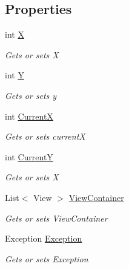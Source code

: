 \subsection*{Properties}
\begin{DoxyCompactItemize}
\item 
int \mbox{\hyperlink{class_gtd_app_1_1_console_core_1_1_views_1_1_helpers_1_1_exception_helper_a9ad22bde1729cc8f0d92143ac2edaaef}{X}}
\begin{DoxyCompactList}\small\item\em Gets or sets X \end{DoxyCompactList}\item 
int \mbox{\hyperlink{class_gtd_app_1_1_console_core_1_1_views_1_1_helpers_1_1_exception_helper_af1f8d53f25515915f741e4c3e8a1ad2d}{Y}}
\begin{DoxyCompactList}\small\item\em Gets or sets y \end{DoxyCompactList}\item 
int \mbox{\hyperlink{class_gtd_app_1_1_console_core_1_1_views_1_1_helpers_1_1_exception_helper_a8ff9d4e536056a83973e592e07465ddc}{CurrentX}}
\begin{DoxyCompactList}\small\item\em Gets or sets currentX \end{DoxyCompactList}\item 
int \mbox{\hyperlink{class_gtd_app_1_1_console_core_1_1_views_1_1_helpers_1_1_exception_helper_a59d144e3f8ba4f019c9d14a9dc3f3a94}{CurrentY}}
\begin{DoxyCompactList}\small\item\em Gets or sets X \end{DoxyCompactList}\item 
List$<$ View $>$ \mbox{\hyperlink{class_gtd_app_1_1_console_core_1_1_views_1_1_helpers_1_1_exception_helper_a996c163ba4da3fb456950930edcfe1d0}{View\+Container}}
\begin{DoxyCompactList}\small\item\em Gets or sets View\+Container \end{DoxyCompactList}\item 
Exception \mbox{\hyperlink{class_gtd_app_1_1_console_core_1_1_views_1_1_helpers_1_1_exception_helper_a29e79c9a6815bd3e00873a913f5337e6}{Exception}}
\begin{DoxyCompactList}\small\item\em Gets or sets Exception \end{DoxyCompactList}\end{DoxyCompactItemize}


